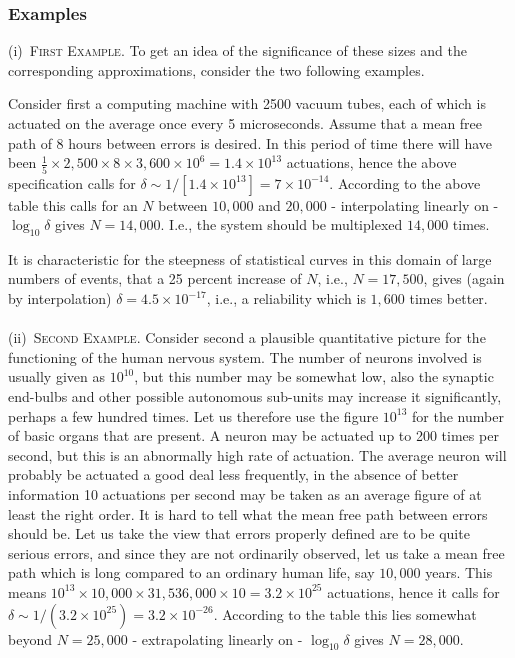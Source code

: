 \documentclass[twocolumn,preprintnumbers,amsmath,amssymb,floatfix]{revtex4}
\begin{document}
\subsubsection{\label{sec:ten5_3}Examples} \noindent (i)~\textsc{First Example}.
To get an idea of the significance of these sizes and the
corresponding approximations, consider the two following examples.

Consider first a computing machine with 2500 vacuum tubes, each of
which is actuated on the average once every 5 microseconds. Assume
that a mean free path of 8 hours between errors is desired. In
this period of time there will have been
$\frac{1}{5}\times2,500\times8\times3,600\times10^6=1.4\times10^{13}$
actuations, hence the above specification calls for
$\delta\sim1/[1.4\times10^{13}]=7\times10^{-14}$. According to the
above table this calls for an $N$ between $10,000$ and $20,000$ -
interpolating linearly on - $\log_{10}{\delta}$ gives $N=14,000$.
I.e., the system should be multiplexed $14,000$ times.

It is characteristic for the steepness of statistical curves in
this domain of large numbers of events, that a 25 percent increase
of $N$, i.e., $N=17,500$, gives (again by interpolation)
$\delta=4.5\times10^{-17}$, i.e., a reliability which is $1,600$
times better.
\\\\
\noindent (ii)~\textsc{Second Example}. Consider second a
plausible quantitative picture for the functioning of the human
nervous system. The number of neurons involved is usually given as
$10^{10}$, but this number may be somewhat low, also the synaptic
end-bulbs and other possible autonomous sub-units may increase it
significantly, perhaps a few hundred times. Let us therefore use
the figure $10^{13}$ for the number of basic organs that are
present. A neuron may be actuated up to 200 times per second, but
this is an abnormally high rate of actuation. The average neuron
will probably be actuated a good deal less frequently, in the
absence of better information 10 actuations per second may be
taken as an average figure of at least the right order. It is hard
to tell what the mean free path between errors should be. Let us
take the view that errors properly defined are to be quite serious
errors, and since they are not ordinarily observed, let us take a
mean free path which is long compared to an ordinary human life,
say $10,000$ years. This means
$10^{13}\times10,000\times31,536,000\times10=3.2\times10^{25}$
actuations, hence it calls for
$\delta\sim1/(3.2\times10^{25})=3.2\times10^{-26}$. According to
the table this lies somewhat beyond $N=25,000$ - extrapolating
linearly on - $\log_{10}{\delta}$ gives $N=28,000$.
\end{document}
